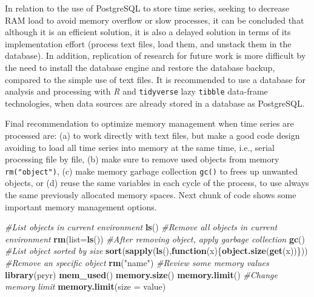 \documentclass[12pt,oneside]{reedthesis}
\newenvironment{Shaded}{\begin{snugshade}}{\end{snugshade}}
\newcommand{\CommentTok}[1]{\textcolor[rgb]{0.56,0.35,0.01}{\textit{#1}}}
\newcommand{\ControlFlowTok}[1]{\textcolor[rgb]{0.13,0.29,0.53}{\textbf{#1}}}
\newcommand{\DataTypeTok}[1]{\textcolor[rgb]{0.13,0.29,0.53}{#1}}
\newcommand{\KeywordTok}[1]{\textcolor[rgb]{0.13,0.29,0.53}{\textbf{#1}}}
\newcommand{\NormalTok}[1]{#1}
\newcommand{\StringTok}[1]{\textcolor[rgb]{0.31,0.60,0.02}{#1}}
\begin{document}
In relation to the use of PostgreSQL to store time series, seeking to decrease RAM load to avoid memory overflow or slow processes, it can be concluded that although it is an efficient solution, it is also a delayed solution in terms of its implementation effort (process text files, load them, and unstack them in the database). In addition, replication of research for future work is more difficult by the need to install the database engine and restore the database backup, compared to the simple use of text files. It is recommended to use a database for analysis and processing with \emph{R} and \texttt{tidyverse} lazy \texttt{tibble} data-frame technologies, when data sources are already stored in a database as PostgreSQL.

Final recommendation to optimize memory management when time series are processed are: (a) to work directly with text files, but make a good code design avoiding to load all time series into memory at the same time, i.e., serial processing file by file, (b) make sure to remove used objects from memory \texttt{rm("object")}, (c) make memory garbage collection \texttt{gc()} to frees up unwanted objects, or (d) reuse the same variables in each cycle of the process, to use always the same previously allocated memory spaces. Next chunk of code shows some important memory management options.

\scriptsize

\vspace{0.4cm}
\begin{Shaded}
\begin{Highlighting}[]
    \CommentTok{#List objects in current environment}
      \KeywordTok{ls}\NormalTok{()}
    \CommentTok{#Remove all objects in current environment}
      \KeywordTok{rm}\NormalTok{(}\DataTypeTok{list=}\KeywordTok{ls}\NormalTok{())}
    \CommentTok{#After removing object, apply garbage collection}
      \KeywordTok{gc}\NormalTok{()}
    \CommentTok{#List object sorted by size}
      \KeywordTok{sort}\NormalTok{(}\KeywordTok{sapply}\NormalTok{(}\KeywordTok{ls}\NormalTok{(),}\ControlFlowTok{function}\NormalTok{(x)\{}\KeywordTok{object.size}\NormalTok{(}\KeywordTok{get}\NormalTok{(x))\}))}
    \CommentTok{#Remove an specific object}
      \KeywordTok{rm}\NormalTok{(}\StringTok{"name"}\NormalTok{)}
    \CommentTok{#Review some memory values}
      \KeywordTok{library}\NormalTok{(pryr)}
      \KeywordTok{mem_used}\NormalTok{()}
      \KeywordTok{memory.size}\NormalTok{()}
      \KeywordTok{memory.limit}\NormalTok{()}
    \CommentTok{#Change memory limit}
      \KeywordTok{memory.limit}\NormalTok{(}\DataTypeTok{size =}\NormalTok{ value)}
\end{Highlighting}
\end{Shaded}
\normalsize
\end{document}
